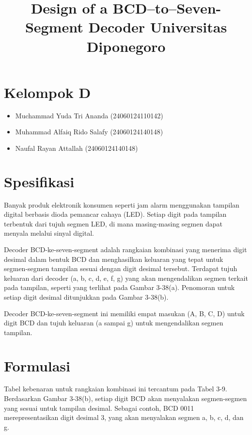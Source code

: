\documentclass{article}
\begin{document}
\title{Design of a BCD–to–Seven-Segment Decoder Universitas Diponegoro }
\author{}
\date{}

\maketitle

\section{Kelompok D}

\begin{itemize}
    \item Muchammad Yuda Tri Ananda (24060124110142)
    \item Muhammad Alfaiq Rido Salafy (24060124140148)
    \item Naufal Rayan Attallah (24060124140148)
\end{itemize}

\section{Spesifikasi}

Banyak produk elektronik konsumen seperti jam alarm menggunakan tampilan digital berbasis dioda pemancar cahaya (LED). Setiap digit pada tampilan terbentuk dari tujuh segmen LED, di mana masing-masing segmen dapat menyala melalui sinyal digital. 

Decoder BCD-ke-seven-segment adalah rangkaian kombinasi yang menerima digit desimal dalam bentuk BCD dan menghasilkan keluaran yang tepat untuk segmen-segmen tampilan sesuai dengan digit desimal tersebut. Terdapat tujuh keluaran dari decoder (a, b, c, d, e, f, g) yang akan mengendalikan segmen terkait pada tampilan, seperti yang terlihat pada Gambar 3-38(a). Penomoran untuk setiap digit desimal ditunjukkan pada Gambar 3-38(b).

Decoder BCD-ke-seven-segment ini memiliki empat masukan (A, B, C, D) untuk digit BCD dan tujuh keluaran (a sampai g) untuk mengendalikan segmen tampilan.

\section{Formulasi}

Tabel kebenaran untuk rangkaian kombinasi ini tercantum pada Tabel 3-9. Berdasarkan Gambar 3-38(b), setiap digit BCD akan menyalakan segmen-segmen yang sesuai untuk tampilan desimal. Sebagai contoh, BCD 0011 merepresentasikan digit desimal 3, yang akan menyalakan segmen a, b, c, d, dan g.
\end{document}
